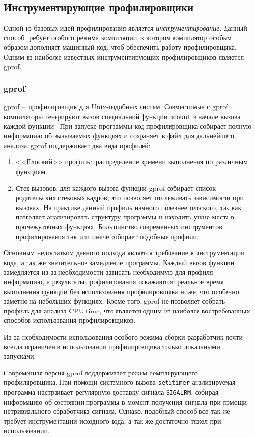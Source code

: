 \subsection{Инструментирующие профилировщики}
Одной из базовых идей профилирования является \textit{инструментирование}. Данный способ требует особого режима компиляции, в котором компилятор особым образом дополняет машинный код, чтоб обеспечить работу профилировщика. Одним из наиболее известных инструментирующих профилировщиков является gprof.

\subsubsection{gprof}
gprof \cite{gprof} – профилировщик для Unix-подобных систем. Совместимые с gprof компиляторы генерируют вызов специальной функции \lstinline!mcount! в начале вызова каждой функции \cite{gprof:mcount}. При запуске программы код профилировщика собирает полную информацию об вызываемых функциях и сохраняет в файл для дальнейшего анализа.
gprof поддерживает два вида профилей:
\begin{enumerate}
    \item <<Плоский>> профиль: распределение времени выполнения по различным функциям.
    \item Стек вызовов: для каждого вызова функции gprof собирает список родительских стековых кадров, что позволяет отслеживать зависимости при вызовах. На практике данный профиль намного полезнее плоского, так как позволяет анализировать структуру программы и находить узкие места в промежуточных функциях. Большинство современных инструментов профилирования так или иначе собирает подобные профили.
\end{enumerate}

Основным недостатком данного подхода является требование к инструментации кода, а так же значительное замедление программы. Каждый вызов функции замедляется из-за необходимости записать необходимую для профиля информацию, а результаты профилирования искажаются: реальное время выполнения функции без использования профилировщика ниже, что особенно заметно на небольших функциях. Кроме того, gprof не позволяет собрать профиль для анализа CPU time, что является одним из наиболее востребованных способов использования профилировщиков.

Из-за необходимости использования особого режима сборки разработчик почти всегда ограничен в использовании профилировщика только локальными запусками.

Современная версия gprof поддерживает режим семплирующего профилировщика.
При помощи системного вызова \lstinline!setitimer! анализируемая программа настраивает регулярную доставку сигнала \lstinline!SIGALRM!, собирая информацию об состоянии программы в момент получения сигнала при помощи нетривиального обработчика сигнала. Однако, подобный способ все так же требует инструментации исходного кода, а так же достаточно тяжел при использовании.

